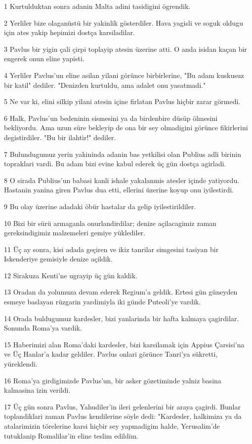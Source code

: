 \par 1 Kurtulduktan sonra adanin Malta adini tasidigini ögrendik.
\par 2 Yerliler bize olaganüstü bir yakinlik gösterdiler. Hava yagisli ve soguk oldugu için ates yakip hepimizi dostça karsiladilar.
\par 3 Pavlus bir yigin çali çirpi toplayip atesin üzerine atti. O anda isidan kaçan bir engerek onun eline yapisti.
\par 4 Yerliler Pavlus'un eline asilan yilani görünce birbirlerine, "Bu adam kuskusuz bir katil" dediler. "Denizden kurtuldu, ama adalet onu yasatmadi."
\par 5 Ne var ki, elini silkip yilani atesin içine firlatan Pavlus hiçbir zarar görmedi.
\par 6 Halk, Pavlus'un bedeninin sismesini ya da birdenbire düsüp ölmesini bekliyordu. Ama uzun süre bekleyip de ona bir sey olmadigini görünce fikirlerini degistirdiler. "Bu bir ilahtir!" dediler.
\par 7 Bulundugumuz yerin yakininda adanin bas yetkilisi olan Publius adli birinin topraklari vardi. Bu adam bizi evine kabul ederek üç gün dostça agirladi.
\par 8 O sirada Publius'un babasi kanli ishale yakalanmis atesler içinde yatiyordu. Hastanin yanina giren Pavlus dua etti, ellerini üzerine koyup onu iyilestirdi.
\par 9 Bu olay üzerine adadaki öbür hastalar da gelip iyilestirildiler.
\par 10 Bizi bir sürü armaganla onurlandirdilar; denize açilacagimiz zaman gereksindigimiz malzemeleri gemiye yüklediler.
\par 11 Üç ay sonra, kisi adada geçiren ve ikiz tanrilar simgesini tasiyan bir Iskenderiye gemisiyle denize açildik.
\par 12 Sirakuza Kenti'ne ugrayip üç gün kaldik.
\par 13 Oradan da yolumuza devam ederek Regium'a geldik. Ertesi gün güneyden esmeye baslayan rüzgarin yardimiyla iki günde Puteoli'ye vardik.
\par 14 Orada buldugumuz kardesler, bizi yanlarinda bir hafta kalmaya çagirdilar. Sonunda Roma'ya vardik.
\par 15 Haberimizi alan Roma'daki kardesler, bizi karsilamak için Appius Çarsisi'na ve Üç Hanlar'a kadar geldiler. Pavlus onlari görünce Tanri'ya sükretti, yüreklendi.
\par 16 Roma'ya girdigimizde Pavlus'un, bir asker gözetiminde yalniz basina kalmasina izin verildi.
\par 17 Üç gün sonra Pavlus, Yahudiler'in ileri gelenlerini bir araya çagirdi. Bunlar toplandiklari zaman Pavlus kendilerine söyle dedi: "Kardesler, halkimiza ya da atalarimizin törelerine karsi hiçbir sey yapmadigim halde, Yerusalim'de tutuklanip Romalilar'in eline teslim edildim.
